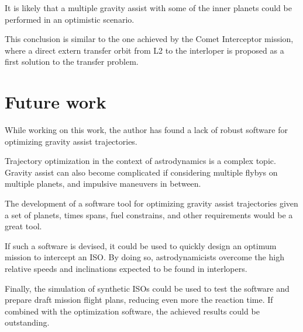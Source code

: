 It is likely that a multiple gravity assist with some of the inner planets could
be performed in an optimistic scenario.

This conclusion is similar to the one achieved by the Comet Interceptor mission,
where a direct extern transfer orbit from L2 to the interloper is proposed as a
first solution to the transfer problem.

\section{Future work}

While working on this work, the author has found a lack of robust software for
optimizing gravity assist trajectories. 

Trajectory optimization in the context of astrodynamics is a complex topic.
Gravity assist can also become complicated if considering multiple flybys on
multiple planets, and impulsive maneuvers in between.

The development of a software tool for optimizing gravity assist trajectories
given a set of planets, times spans, fuel constrains, and other requirements
would be a great tool. 

If such a software is devised, it could be used to quickly design an optimum
mission to intercept an ISO. By doing so, astrodynamicists overcome the high
relative speeds and inclinations expected to be found in interlopers.

Finally, the simulation of synthetic ISOs could be used to test the software and
prepare draft mission flight plans, reducing even more the reaction time. If
combined with the optimization software, the achieved results could be
outstanding.
